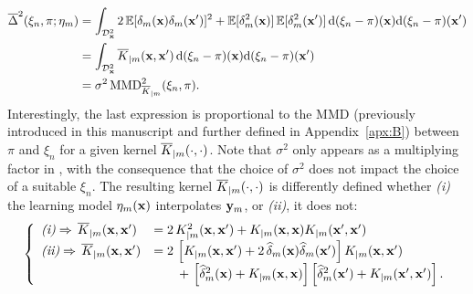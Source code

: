 \begin{subequations}
    \begin{align}
        \overline{\Delta}^2(\xi_n,\pi;\eta_m)&= \int_{\mathcal{D}_{\bf x}^2} 2 \, \mathbb{E}[\delta_m({\bf x})\delta_m({\bf x}')]^2 + \mathbb{E}[\delta_m^2({\bf x})] \, \mathbb{E}[\delta_m^2({\bf x}')] \,\mathrm{d}(\xi_n-\pi)({\bf x})\mathrm{d}(\xi_n-\pi)({\bf x}') \\
                                             &= \int_{\mathcal{D}_{\bf x}^2} \overline{K}_{|m}({\bf x}, {\bf x}')\,\mathrm{d}(\xi_n-\pi)({\bf x})\mathrm{d}(\xi_n-\pi)({\bf x}') \\
                                             &= \sigma^2\, \mathrm{MMD}_{\overline{K}_{|m}}^2(\xi_n,\pi).\label{eq:c5_variance}
    \end{align}
\end{subequations}
Interestingly, the last expression is proportional to the MMD (previously introduced in this manuscript and further defined in Appendix~\ref{apx:B}) between $\pi$ and $\xi_n$ for a given kernel $\overline{K}_{|m}(\cdot, \cdot)$. 
Note that $\sigma^2$ only appears as a multiplying factor in , with the consequence that the choice of $\sigma^2$ does not impact the choice of a suitable $\xi_n$.
The resulting kernel $\overline{K}_{|m}(\cdot, \cdot)$ is differently defined whether \textit{(i)} the learning model $\eta_m({\bf x})$ interpolates ${\bf y}_m$, or \textit{(ii)}, it does not: 
\begin{align}
    \left\{
    \begin{array}{ll}
        \textit{(i)}  \Rightarrow  \, \overline{K}_{|m}({\bf x},{\bf x}')&= 2\, K_{|m}^2({\bf x},{\bf x}') + K_{|m}({\bf x},{\bf x}) K_{|m}({\bf x}',{\bf x}')\\
        \textit{(ii)} \Rightarrow  \, \overline{K}_{|m}({\bf x},{\bf x}')&= 2\, \left[K_{|m}({\bf x},{\bf x}') + 2\,\widehat\delta_m({\bf x})\widehat\delta_m({\bf x}')\right]K_{|m}({\bf x},{\bf x}') \\
                                                        & \qquad +\,\left[\widehat\delta_m^2({\bf x})+K_{|m}({\bf x},{\bf x})\right]\left[\widehat\delta_m^2({\bf x}')+K_{|m}({\bf x}',{\bf x}')\right]. 
        \label{Eq:Kbarbar}
    \end{array}
\right.
\end{align}


